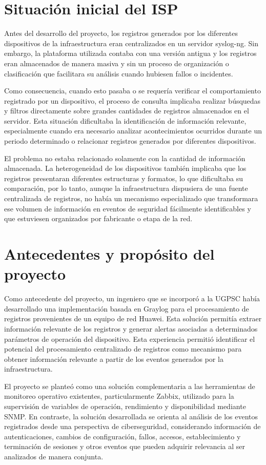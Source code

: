 \section{Situación inicial del ISP}
Antes del desarrollo del proyecto, los registros generados por los diferentes dispositivos de la infraestructura eran centralizados en un servidor syslog-ng. Sin embargo, la plataforma utilizada contaba con una versión antigua y los registros eran almacenados de manera masiva y sin un proceso de organización o clasificación que facilitara su análisis cuando hubiesen fallos o incidentes.

Como consecuencia, cuando esto pasaba o se requería verificar el comportamiento registrado por un dispositivo, el proceso de consulta implicaba realizar búsquedas y filtros directamente sobre grandes cantidades de registros almacenados en el servidor. Esta situación dificultaba la identificación de información relevante, especialmente cuando era necesario analizar acontecimientos ocurridos durante un periodo determinado o relacionar registros generados por diferentes dispositivos.

El problema no estaba relacionado solamente con la cantidad de información almacenada. La heterogeneidad de los dispositivos también implicaba que los registros presentaran diferentes estructuras y formatos, lo que dificultaba su comparación, por lo tanto, aunque la infraestructura dispusiera de una fuente centralizada de registros, no había un mecanismo especializado que transformara ese volumen de información en eventos de seguridad fácilmente identificables y que estuviesen organizados por fabricante o etapa de la red.

\section{Antecedentes y propósito del proyecto}
Como antecedente del proyecto, un ingeniero que se incorporó a la UGPSC había desarrollado una implementación basada en Graylog para el procesamiento de registros provenientes de un equipo de red Huawei. Esta solución permitía extraer información relevante de los registros y generar alertas asociadas a determinados parámetros de operación del dispositivo. Esta experiencia permitió identificar el potencial del procesamiento centralizado de registros como mecanismo para obtener información relevante a partir de los eventos generados por la infraestructura.

El proyecto se planteó como una solución complementaria a las herramientas de monitoreo operativo existentes, particularmente Zabbix, utilizado para la supervisión de variables de operación, rendimiento y disponibilidad mediante SNMP. En contraste, la solución desarrollada se orienta al análisis de los eventos registrados desde una perspectiva de ciberseguridad, considerando información de autenticaciones, cambios de configuración, fallos, accesos, establecimiento y terminación de sesiones y otros eventos que pueden adquirir relevancia al ser analizados de manera conjunta.

